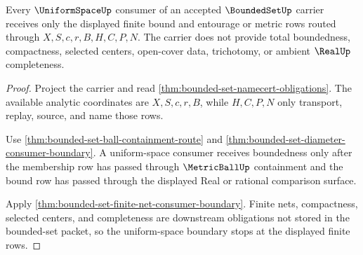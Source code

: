 \begin{theorem}
\label{thm:bounded-set-uniform-space-boundary}
Every $\UniformSpaceUp$ consumer of an accepted $\BoundedSetUp$ carrier receives only the displayed finite bound and entourage or metric rows routed through $X,S,c,r,B,H,C,P,N$. The carrier does not provide total boundedness, compactness, selected centers, open-cover data, trichotomy, or ambient $\RealUp$ completeness.
\end{theorem}
\begin{proof}
Project the carrier and read \autoref{thm:bounded-set-namecert-obligations}. The available analytic coordinates are $X,S,c,r,B$, while $H,C,P,N$ only transport, replay, source, and name those rows.

Use \autoref{thm:bounded-set-ball-containment-route} and \autoref{thm:bounded-set-diameter-consumer-boundary}. A uniform-space consumer receives boundedness only after the membership row has passed through $\MetricBallUp$ containment and the bound row has passed through the displayed Real or rational comparison surface.

Apply \autoref{thm:bounded-set-finite-net-consumer-boundary}. Finite nets, compactness, selected centers, and completeness are downstream obligations not stored in the bounded-set packet, so the uniform-space boundary stops at the displayed finite rows.
\end{proof}

